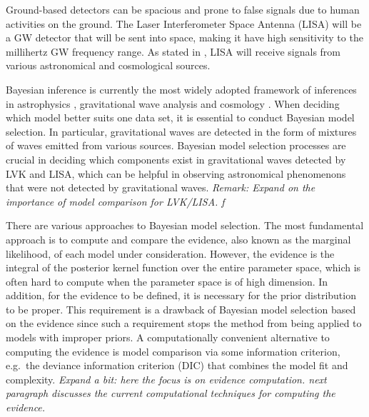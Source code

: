 \documentclass[%
 reprint,
 amsmath,amssymb,
 aps,
]{revtex4-2}
\begin{document}
Ground-based detectors can be spacious and prone to false signals due to human activities on the ground. The Laser Interferometer Space Antenna (LISA) will be a GW detector that will be sent into space, making it have high sensitivity to the millihertz GW frequency range. As stated in \cite{boileau2023prospects}, LISA will receive signals from various astronomical and cosmological sources.

Bayesian inference is currently the most widely adopted framework of inferences in astrophysics \cite{saha1994unfolding}, gravitational wave analysis \cite{christensen1998markov} and cosmology \cite{christensen2001bayesian, knox2001age}. When deciding which model better suits one data set, it is essential to conduct Bayesian model selection. In particular, gravitational waves are detected in the form of mixtures of waves emitted from various sources. Bayesian model selection processes are crucial in deciding which components exist in gravitational waves detected by LVK and LISA, which can be helpful in observing astronomical phenomenons that were not detected by gravitational waves. {\em Remark: Expand on the importance of model comparison for LVK/LISA. f}

There are various approaches to Bayesian model selection. The most fundamental approach is to compute and compare the evidence, also known as the marginal likelihood, of each model under consideration. However, the evidence is the integral of the posterior kernel function over the entire parameter space, which is often hard to compute when the parameter space is of high dimension. In addition, for the evidence to be defined, it is necessary for the prior distribution to be proper. This requirement is a drawback of Bayesian model selection based on the evidence since such a requirement stops the method from being applied to models with improper priors.
A computationally convenient alternative to computing the evidence is model comparison via some information criterion, e.g.\ the deviance information criterion (DIC) \cite{spiegelhalter2002bayesian} that combines the model fit and complexity. {\em Expand a bit: here the focus is on evidence computation. next paragraph discusses the current computational techniques for computing the evidence. }
\end{document}
